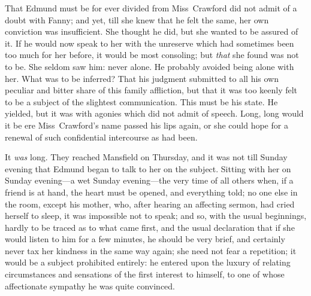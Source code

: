 That Edmund must be for ever divided from Miss~Crawford did not admit of a doubt with Fanny; and yet, till she knew that he felt the same, her own conviction was insufficient. She thought he did, but she wanted to be assured of it. If he would now speak to her with the unreserve which had sometimes been too much for her before, it would be most consoling; but \textit{that}  she found was not to be. She seldom saw him: never alone. He probably avoided being alone with her. What was to be inferred? That his judgment submitted to all his own peculiar and bitter share of this family affliction, but that it was too keenly felt to be a subject of the slightest communication. This must be his state. He yielded, but it was with agonies which did not admit of speech. Long, long would it be ere Miss~Crawford's name passed his lips again, or she could hope for a renewal of such confidential intercourse as had been.

It \textit{was}  long. They reached Mansfield on Thursday, and it was not till Sunday evening that Edmund began to talk to her on the subject. Sitting with her on Sunday evening—a wet Sunday evening—the very time of all others when, if a friend is at hand, the heart must be opened, and everything told; no one else in the room, except his mother, who, after hearing an affecting sermon, had cried herself to sleep, it was impossible not to speak; and so, with the usual beginnings, hardly to be traced as to what came first, and the usual declaration that if she would listen to him for a few minutes, he should be very brief, and certainly never tax her kindness in the same way again; she need not fear a repetition; it would be a subject prohibited entirely: he entered upon the luxury of relating circumstances and sensations of the first interest to himself, to one of whose affectionate sympathy he was quite convinced.

